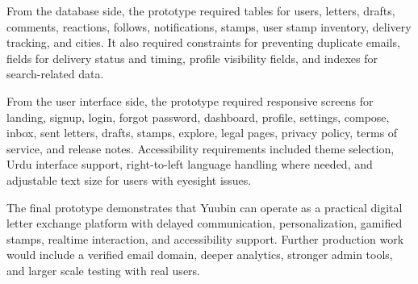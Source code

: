 ﻿\documentclass[12pt,a4paper]{report}
\begin{document}
From the database side, the prototype required tables for users, letters, drafts, comments, reactions, follows, notifications, stamps, user stamp inventory, delivery tracking, and cities. It also required constraints for preventing duplicate emails, fields for delivery status and timing, profile visibility fields, and indexes for search-related data.

From the user interface side, the prototype required responsive screens for landing, signup, login, forgot password, dashboard, profile, settings, compose, inbox, sent letters, drafts, stamps, explore, legal pages, privacy policy, terms of service, and release notes. Accessibility requirements included theme selection, Urdu interface support, right-to-left language handling where needed, and adjustable text size for users with eyesight issues.

The final prototype demonstrates that Yuubin can operate as a practical digital letter exchange platform with delayed communication, personalization, gamified stamps, realtime interaction, and accessibility support. Further production work would include a verified email domain, deeper analytics, stronger admin tools, and larger scale testing with real users.

\newpage

\clearpage

\newpage
\listoffigures
{}

\newpage
\listoftables
{}

\clearpage

\renewcommand{\bibname}{References}
\end{document}
